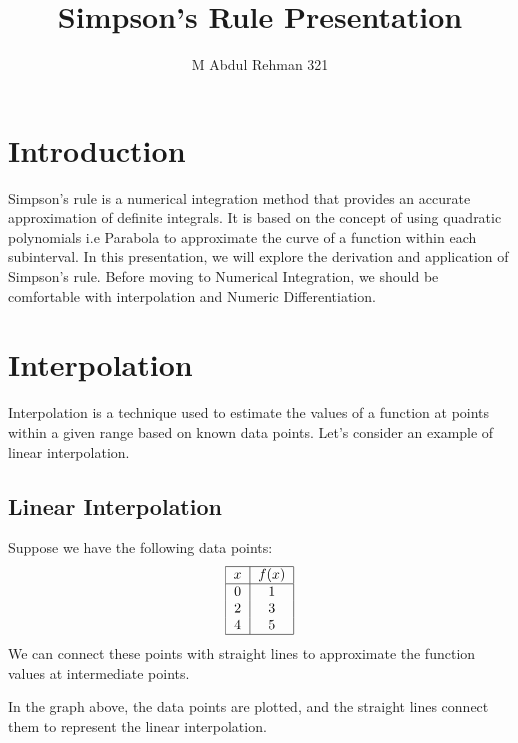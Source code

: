\documentclass[a4paper]{article}
\title{ \textbf{Simpson's Rule Presentation}}
\author{M Abdul Rehman 321}
\begin{document}
\maketitle

\section{Introduction}
\textsf{Simpson's rule is a numerical integration method that provides an accurate approximation of definite integrals. It is based on the concept of using quadratic polynomials i.e Parabola to approximate the curve of a function within each subinterval. In this presentation, we will explore the derivation and application of Simpson's rule. Before moving to Numerical Integration, we should be comfortable with interpolation and Numeric Differentiation.}

\section{Interpolation}
Interpolation is a technique used to estimate the values of a function at points within a given range based on known data points. Let's consider an example of linear interpolation.


\subsection{Linear Interpolation}
Suppose we have the following data points:
\[
\begin{tabular}{|c|c|}
\hline
$x$ & $f(x)$ \\
\hline
0 & 1 \\
2 & 3 \\
4 & 5 \\
\hline
\end{tabular}
\]
We can connect these points with straight lines to approximate the function values at intermediate points.

\begin{center}
\end{center}

In the graph above, the data points are plotted, and the straight lines connect them to represent the linear interpolation.
\end{document}
